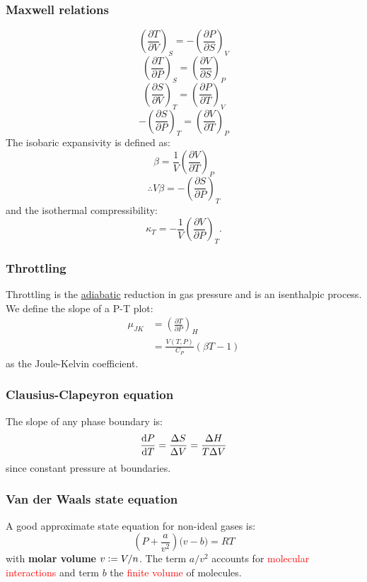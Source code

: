 \documentclass{article}
\newcommand{\deq}{\vcentcolon=}
\begin{document}
\begin{multicols*}{3}
\subsubsection*{Maxwell relations}
$$\left(\frac{\partial T}{\partial V}\right)_S
=-\left(\frac{\partial P}{\partial S}\right)_V$$
$$\left(\frac{\partial T}{\partial P}\right)_S
=\left(\frac{\partial V}{\partial S}\right)_P$$
$$\left(\frac{\partial S}{\partial V}\right)_T
=\left(\frac{\partial P}{\partial T}\right)_V$$
$$-\left(\frac{\partial S}{\partial P}\right)_T
=\left(\frac{\partial V}{\partial T}\right)_P$$
The isobaric expansivity is defined as:
$$\beta=\frac{1}{V}
\left(\frac{\partial V}{\partial T}\right)_P$$
$$\therefore V\beta=
-\left(\frac{\partial S}{\partial P}\right)_T$$
and the isothermal compressibility:
$$\kappa_T=-\frac{1}{V}
\left(\frac{\partial V}{\partial P}\right)_T.$$

\subsubsection*{Throttling}
Throttling is the \underline{adiabatic} 
reduction in gas pressure
and is an isenthalpic process.
We define
the slope of a P-T plot:
\begin{align*}
    \mu_{JK}&=\left(
    \frac{\partial T}{\partial P}\right)_H \\
    &=\frac{V(T,P)}{C_P}(\beta T-1)
\end{align*}
as the
Joule-Kelvin coefficient.

\subsubsection*{Clausius-Clapeyron equation}
The slope of any phase boundary is:
$$\dv{P}{T}=\frac{\Delta S}{\Delta V}
=\frac{\Delta H}{T\Delta V}$$
since constant pressure at boundaries.

\subsubsection*{Van der Waals state equation}
A good approximate state equation
for non-ideal gases is:
$$\left(P+\frac{a}{v^2}\right)
\bigl(v-b\bigr)=RT$$
with \textbf{molar volume} $v\deq V/n$.
The term
$a/v^2$ accounts for \textcolor{red}{molecular interactions}
and term $b$ the \textcolor{red}{finite volume} of molecules.


\end{multicols*}
\end{document}

